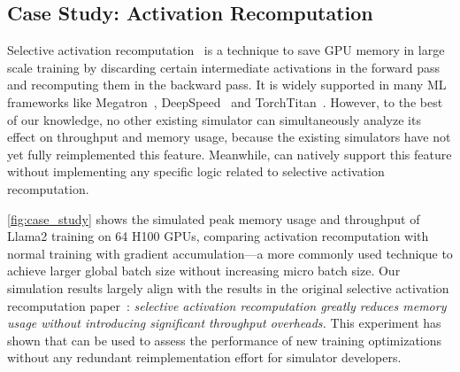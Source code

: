 \subsection{Case Study: Activation Recomputation}

Selective activation recomputation~\cite{korthikanti2023ac} is a technique to save GPU memory in large scale training by discarding certain intermediate activations in the forward pass and recomputing them in the backward pass. It is widely supported in many ML frameworks like Megatron~\cite{shoeybi2019megatron}, DeepSpeed~\cite{rasley2020deepspeed} and TorchTitan~\cite{liang2025torchtitan}. However, to the best of our knowledge, no other existing simulator can simultaneously analyze its effect on throughput and memory usage, because the existing simulators have not yet fully reimplemented this feature. Meanwhile, \sys can natively support this feature without implementing any specific logic related to selective activation recomputation.

\autoref{fig:case_study} shows the simulated peak memory usage and throughput of Llama2 training on 64 H100 GPUs, comparing activation recomputation with normal training with gradient accumulation---a more commonly used technique to achieve larger global batch size without increasing micro batch size.
Our simulation results largely align with the results in the original selective activation recomputation paper~\cite{korthikanti2023ac}: \textit{selective activation recomputation greatly reduces memory usage without introducing significant throughput overheads.} This experiment has shown that \sys can be used to assess the performance of new training optimizations without any redundant reimplementation effort for simulator developers.
